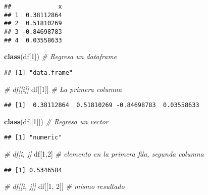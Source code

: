 \documentclass[]{article}
\newenvironment{Shaded}{\begin{snugshade}}{\end{snugshade}}
\newcommand{\KeywordTok}[1]{\textcolor[rgb]{0.13,0.29,0.53}{\textbf{#1}}}
\newcommand{\DecValTok}[1]{\textcolor[rgb]{0.00,0.00,0.81}{#1}}
\newcommand{\CommentTok}[1]{\textcolor[rgb]{0.56,0.35,0.01}{\textit{#1}}}
\newcommand{\NormalTok}[1]{#1}
\begin{document}
\begin{verbatim}
##             x
## 1  0.38112864
## 2  0.51810269
## 3 -0.84698783
## 4  0.03558633
\end{verbatim}

\begin{Shaded}
\begin{Highlighting}[]
\KeywordTok{class}\NormalTok{(df[}\DecValTok{1}\NormalTok{]) }\CommentTok{# Regresa un dataframe}
\end{Highlighting}
\end{Shaded}

\begin{verbatim}
## [1] "data.frame"
\end{verbatim}

\begin{Shaded}
\begin{Highlighting}[]
\CommentTok{# df[[i]]}
\NormalTok{df[[}\DecValTok{1}\NormalTok{]] }\CommentTok{# La primera columna}
\end{Highlighting}
\end{Shaded}

\begin{verbatim}
## [1]  0.38112864  0.51810269 -0.84698783  0.03558633
\end{verbatim}

\begin{Shaded}
\begin{Highlighting}[]
\KeywordTok{class}\NormalTok{(df[[}\DecValTok{1}\NormalTok{]]) }\CommentTok{# Regresa un vector }
\end{Highlighting}
\end{Shaded}

\begin{verbatim}
## [1] "numeric"
\end{verbatim}

\begin{Shaded}
\begin{Highlighting}[]
\CommentTok{# df[i, j]}
\NormalTok{df[}\DecValTok{1}\NormalTok{,}\DecValTok{2}\NormalTok{] }\CommentTok{# elemento en la primera fila, segunda columna}
\end{Highlighting}
\end{Shaded}

\begin{verbatim}
## [1] 0.5346584
\end{verbatim}

\begin{Shaded}
\begin{Highlighting}[]
\CommentTok{# df[[i, j]]}
\NormalTok{df[[}\DecValTok{1}\NormalTok{, }\DecValTok{2}\NormalTok{]] }\CommentTok{# mismo resultado}
\end{Highlighting}
\end{Shaded}
\end{document}
